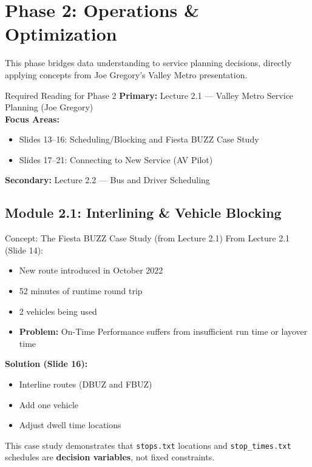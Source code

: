 \documentclass[11pt,letterpaper]{article}
\begin{document}
\section{Phase 2: Operations \& Optimization}

This phase bridges data understanding to service planning decisions, directly applying concepts from Joe Gregory's Valley Metro presentation.

\begin{readingbox}{Required Reading for Phase 2}
\textbf{Primary:} Lecture 2.1 --- Valley Metro Service Planning (Joe Gregory)\\
\textbf{Focus Areas:}
\begin{itemize}[nosep]
    \item Slides 13--16: Scheduling/Blocking and Fiesta BUZZ Case Study
    \item Slides 17--21: Connecting to New Service (AV Pilot)
\end{itemize}
\textbf{Secondary:} Lecture 2.2 --- Bus and Driver Scheduling
\end{readingbox}

\subsection{Module 2.1: Interlining \& Vehicle Blocking}

\begin{conceptbox}{Concept: The Fiesta BUZZ Case Study (from Lecture 2.1)}
From Lecture 2.1 (Slide 14):
\begin{itemize}[nosep]
    \item New route introduced in October 2022
    \item 52 minutes of runtime round trip
    \item 2 vehicles being used
    \item \textbf{Problem:} On-Time Performance suffers from insufficient run time or layover time
\end{itemize}

\textbf{Solution (Slide 16):}
\begin{itemize}[nosep]
    \item Interline routes (DBUZ and FBUZ)
    \item Add one vehicle
    \item Adjust dwell time locations
\end{itemize}

This case study demonstrates that \texttt{stops.txt} locations and \texttt{stop\_times.txt} schedules are \textbf{decision variables}, not fixed constraints.
\end{conceptbox}
\end{document}
